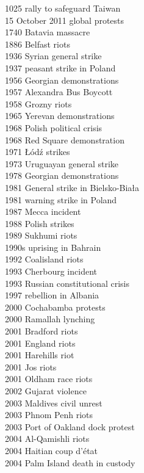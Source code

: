 1025 rally to safeguard Taiwan\\
15 October 2011 global protests\\
1740 Batavia massacre\\
1886 Belfast riots\\
1936 Syrian general strike\\
1937 peasant strike in Poland\\
1956 Georgian demonstrations\\
1957 Alexandra Bus Boycott\\
1958 Grozny riots\\
1965 Yerevan demonstrations\\
1968 Polish political crisis\\
1968 Red Square demonstration\\
1971 Łódź strikes\\
1973 Uruguayan general strike\\
1978 Georgian demonstrations\\
1981 General strike in Bielsko-Biała\\
1981 warning strike in Poland\\
1987 Mecca incident\\
1988 Polish strikes\\
1989 Sukhumi riots\\
1990s uprising in Bahrain\\
1992 Coalisland riots\\
1993 Cherbourg incident\\
1993 Russian constitutional crisis\\
1997 rebellion in Albania\\
2000 Cochabamba protests\\
2000 Ramallah lynching\\
2001 Bradford riots\\
2001 England riots\\
2001 Harehills riot\\
2001 Jos riots\\
2001 Oldham race riots\\
2002 Gujarat violence\\
2003 Maldives civil unrest\\
2003 Phnom Penh riots\\
2003 Port of Oakland dock protest\\
2004 Al-Qamishli riots\\
2004 Haitian coup d'état\\
2004 Palm Island death in custody\\
